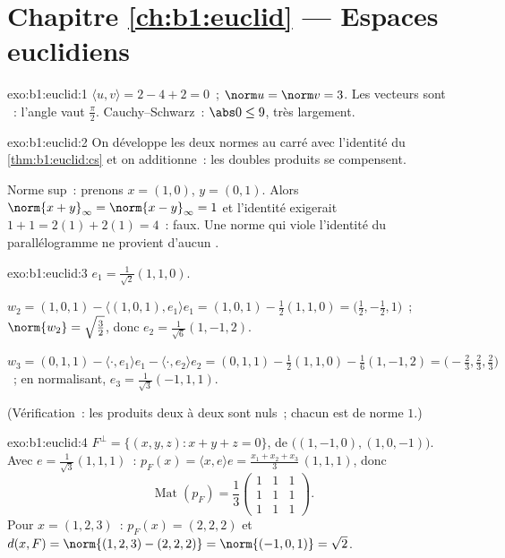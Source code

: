 \section*{Chapitre \ref{ch:b1:euclid} --- Espaces euclidiens}

\begin{solution}{exo:b1:euclid:1}
$\langle u, v\rangle = 2 - 4 + 2 = 0$~; $\norm u = \norm v = 3$. Les
vecteurs sont ~: l'angle vaut $\frac\pi2$. Cauchy--Schwarz~:
$\abs 0 \leq 9$, très largement.
\end{solution}

\begin{solution}{exo:b1:euclid:2}
On développe les deux normes au carré avec l'identité du
\cref{thm:b1:euclid:cs} et on additionne~: les doubles produits se
compensent.

Norme sup~: prenons $x = (1, 0)$, $y = (0, 1)$. Alors $\norm{x +
y}_\infty = \norm{x - y}_\infty = 1$ et l'identité exigerait $1 + 1 =
2(1) + 2(1) = 4$~: faux. Une norme qui viole l'identité du
parallélogramme ne provient d'aucun .
\end{solution}

\begin{solution}{exo:b1:euclid:3}
$e_1 = \frac{1}{\sqrt 2}(1,1,0)$.

$w_2 = (1,0,1) - \langle (1,0,1), e_1\rangle e_1 = (1,0,1) -
\frac{1}{2}(1,1,0) = \bigl(\tfrac12, -\tfrac12, 1\bigr)$~;
$\norm{w_2} = \sqrt{\tfrac32}$, donc $e_2 =
\frac{1}{\sqrt 6}(1, -1, 2)$.

$w_3 = (0,1,1) - \langle\cdot, e_1\rangle e_1 - \langle\cdot,
e_2\rangle e_2 = (0,1,1) - \frac12 (1,1,0) - \frac16(1,-1,2) =
\bigl(-\tfrac23, \tfrac23, \tfrac23\bigr)$~; en normalisant, $e_3 =
\frac{1}{\sqrt 3}(-1, 1, 1)$.

(Vérification~: les produits deux à deux sont nuls~; chacun est de
norme $1$.)
\end{solution}

\begin{solution}{exo:b1:euclid:4}
$F^\perp = \{(x,y,z) : x + y + z = 0\}$, de  $\bigl((1,-1,0),
(1,0,-1)\bigr)$. Avec $e = \frac{1}{\sqrt3}(1,1,1)$~: $p_F(x) =
\langle x, e\rangle e = \frac{x_1 + x_2 + x_3}{3}\,(1,1,1)$, donc
\[
\operatorname{Mat}(p_F) = \frac13
\begin{pmatrix} 1&1&1\\ 1&1&1\\ 1&1&1\end{pmatrix}.
\]
Pour $x = (1,2,3)$~: $p_F(x) = (2,2,2)$ et $d(x, F) = \norm{(1,2,3)
- (2,2,2)} = \norm{(-1,0,1)} = \sqrt 2$.
\end{solution}

